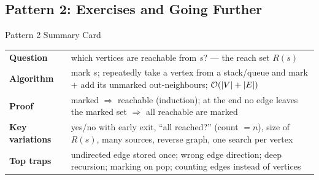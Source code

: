 \subsection{Pattern 2: Exercises and Going Further}
\label{ssec:ch1-p2-ex}

\begin{patternbox}{Pattern 2 Summary Card}
\begin{tabularx}{\linewidth}{@{}>{\bfseries}l X@{}}
Question & which vertices are reachable from $s$? --- the reach set $R(s)$ \\
Algorithm & mark $s$; repeatedly take a vertex from a stack/queue and mark + add its unmarked out-neighbours; $\mathcal{O}(|V|+|E|)$ \\
Proof & marked $\Rightarrow$ reachable (induction); at the end no edge leaves the marked set $\Rightarrow$ all reachable are marked \\
Key variations & yes/no with early exit, ``all reached?'' (count $= n$), size of $R(s)$, many sources, reverse graph, one search per vertex \\
Top traps & undirected edge stored once; wrong edge direction; deep recursion; marking on pop; counting edges instead of vertices \\
\end{tabularx}
\end{patternbox}

